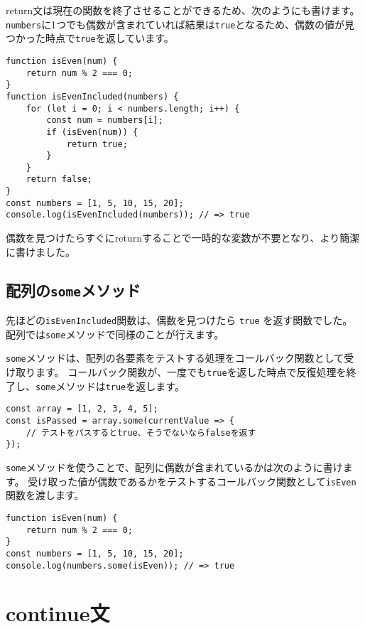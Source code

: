 return文は現在の関数を終了させることができるため、次のようにも書けます。
\texttt{numbers}に1つでも偶数が含まれていれば結果は\texttt{true}となるため、偶数の値が見つかった時点で\texttt{true}を返しています。

\begin{lstlisting}
function isEven(num) {
    return num % 2 === 0;
}
function isEvenIncluded(numbers) {
    for (let i = 0; i < numbers.length; i++) {
        const num = numbers[i];
        if (isEven(num)) {
            return true;
        }
    }
    return false;
}
const numbers = [1, 5, 10, 15, 20];
console.log(isEvenIncluded(numbers)); // => true
\end{lstlisting}

偶数を見つけたらすぐにreturnすることで一時的な変数が不要となり、より簡潔に書けました。

\hypertarget{array-some}{%
\subsection{\texorpdfstring{配列の\texttt{some}メソッド}{配列のsomeメソッド}}\label{array-some}}

先ほどの\texttt{isEvenIncluded}関数は、偶数を見つけたら
\texttt{true} を返す関数でした。
配列では\texttt{some}メソッドで同様のことが行えます。

\texttt{some}メソッドは、配列の各要素をテストする処理をコールバック関数として受け取ります。
コールバック関数が、一度でも\texttt{true}を返した時点で反復処理を終了し、\texttt{some}メソッドは\texttt{true}を返します。

\begin{lstlisting}
const array = [1, 2, 3, 4, 5];
const isPassed = array.some(currentValue => {
    // テストをパスするとtrue、そうでないならfalseを返す
});
\end{lstlisting}

\texttt{some}メソッドを使うことで、配列に偶数が含まれているかは次のように書けます。
受け取った値が偶数であるかをテストするコールバック関数として\texttt{isEven}関数を渡します。

\begin{lstlisting}
function isEven(num) {
    return num % 2 === 0;
}
const numbers = [1, 5, 10, 15, 20];
console.log(numbers.some(isEven)); // => true
\end{lstlisting}

\hypertarget{continue-statement}{%
\section{continue文}\label{continue-statement}}

